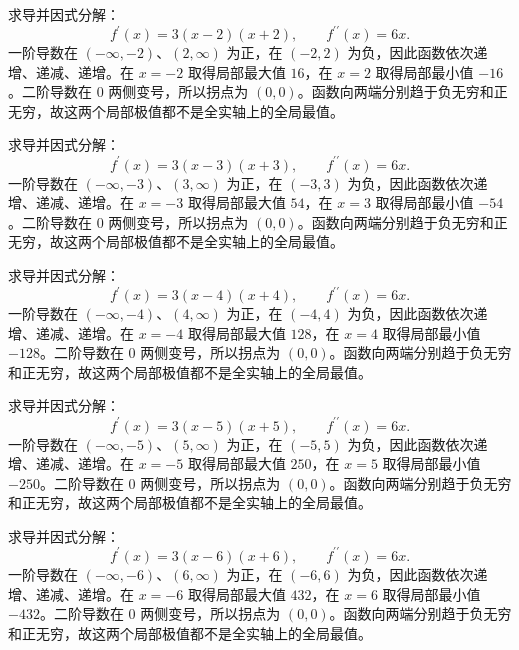 \documentclass[UTF8,12pt,a4paper,fontset=fandol]{ctexart}
\begin{document}
\begin{solve}\label{ans:c11q3}
求导并因式分解：
\[
f^{\prime}(x)=3(x-2)(x+2),\qquad f^{\prime\prime}(x)=6x.
\]
一阶导数在 $(-\infty,-2)$、$(2,\infty)$ 为正，在 $(-2,2)$ 为负，因此函数依次递增、递减、递增。在 $x=-2$ 取得局部最大值 $16$，在 $x=2$ 取得局部最小值 $-16$。二阶导数在 $0$ 两侧变号，所以拐点为 $(0,0)$。函数向两端分别趋于负无穷和正无穷，故这两个局部极值都不是全实轴上的全局最值。
\end{solve}

\begin{solve}\label{ans:c11q4}
求导并因式分解：
\[
f^{\prime}(x)=3(x-3)(x+3),\qquad f^{\prime\prime}(x)=6x.
\]
一阶导数在 $(-\infty,-3)$、$(3,\infty)$ 为正，在 $(-3,3)$ 为负，因此函数依次递增、递减、递增。在 $x=-3$ 取得局部最大值 $54$，在 $x=3$ 取得局部最小值 $-54$。二阶导数在 $0$ 两侧变号，所以拐点为 $(0,0)$。函数向两端分别趋于负无穷和正无穷，故这两个局部极值都不是全实轴上的全局最值。
\end{solve}

\begin{solve}\label{ans:c11q5}
求导并因式分解：
\[
f^{\prime}(x)=3(x-4)(x+4),\qquad f^{\prime\prime}(x)=6x.
\]
一阶导数在 $(-\infty,-4)$、$(4,\infty)$ 为正，在 $(-4,4)$ 为负，因此函数依次递增、递减、递增。在 $x=-4$ 取得局部最大值 $128$，在 $x=4$ 取得局部最小值 $-128$。二阶导数在 $0$ 两侧变号，所以拐点为 $(0,0)$。函数向两端分别趋于负无穷和正无穷，故这两个局部极值都不是全实轴上的全局最值。
\end{solve}

\begin{solve}\label{ans:c11q6}
求导并因式分解：
\[
f^{\prime}(x)=3(x-5)(x+5),\qquad f^{\prime\prime}(x)=6x.
\]
一阶导数在 $(-\infty,-5)$、$(5,\infty)$ 为正，在 $(-5,5)$ 为负，因此函数依次递增、递减、递增。在 $x=-5$ 取得局部最大值 $250$，在 $x=5$ 取得局部最小值 $-250$。二阶导数在 $0$ 两侧变号，所以拐点为 $(0,0)$。函数向两端分别趋于负无穷和正无穷，故这两个局部极值都不是全实轴上的全局最值。
\end{solve}

\begin{solve}\label{ans:c11q7}
求导并因式分解：
\[
f^{\prime}(x)=3(x-6)(x+6),\qquad f^{\prime\prime}(x)=6x.
\]
一阶导数在 $(-\infty,-6)$、$(6,\infty)$ 为正，在 $(-6,6)$ 为负，因此函数依次递增、递减、递增。在 $x=-6$ 取得局部最大值 $432$，在 $x=6$ 取得局部最小值 $-432$。二阶导数在 $0$ 两侧变号，所以拐点为 $(0,0)$。函数向两端分别趋于负无穷和正无穷，故这两个局部极值都不是全实轴上的全局最值。
\end{solve}
\end{document}
